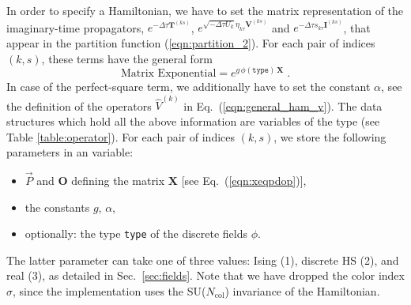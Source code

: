 In order to specify a Hamiltonian, we have to set the matrix representation of the imaginary-time propagators,
$ e^{-\Delta \tau {\bm T}^{(ks)}}$, $e^{  \sqrt{- \Delta \tau  U_k} \eta_{k\tau} {\bm V}^{(ks)} }$ and $e^{  -\Delta \tau s_{k\tau}  {\bm I}^{(ks)}}$, that appear in the 
partition function (\ref{eqn:partition_2}).  For each pair of indices $(k,s)$, these terms have the general form
\begin{equation}\label{eqn:exponent_mat}
\text{Matrix Exponential}=
e^{g \,\phi(\texttt{type})\,\bm{X} }\;.
\end{equation}
In case of the  perfect-square term,  we additionally have to set the constant $\alpha$, see the definition of the operators $\hat{V}^{(k)}$ in Eq.~(\ref{eqn:general_ham_v}).
The data structures which hold all the above information are variables of the type  (see Table \ref{table:operator}). 
For each pair of indices $(k,s)$, we store the following parameters in an  variable:
\begin{itemize}
\item $\vec{P}$ and   $ \bm{O}$   defining the matrix $\bm{X}$ [see Eq.~(\ref{eqn:xeqpdop})],
\item the constants $g$, $\alpha$,
\item optionally: the type \texttt{type} of the discrete fields $\phi$.
\end{itemize}
The latter parameter can take one of three values: Ising (1), discrete HS (2), and real (3), as detailed in Sec.~\ref{sec:fields}.
Note that we have dropped the color index $\sigma$, since the implementation uses the SU($N_{\mathrm{col}}$) invariance of the Hamiltonian. 

